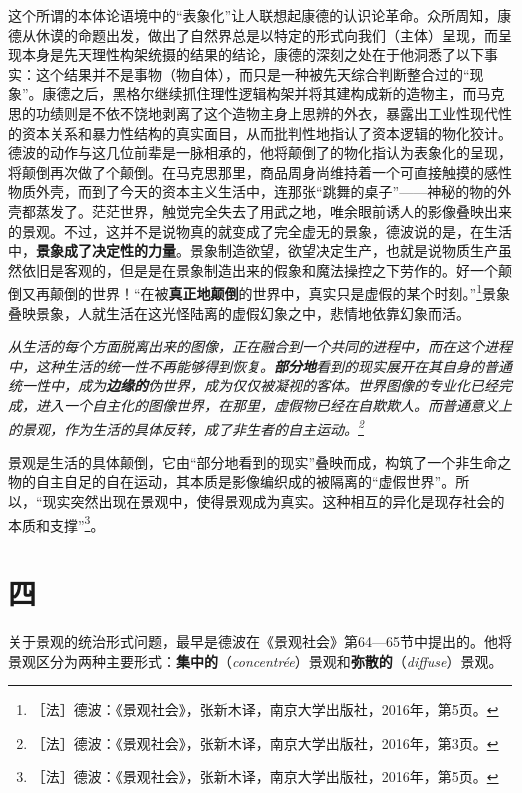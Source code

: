 \documentclass[fontset=fandol, a4paper, 12pt, openright]{ctexbook}
\renewenvironment{quote}
  {\list{}{\rightmargin\leftmargin}%
   \item\relax\small\itshape\color{darkgray}}
  {\endlist}
\begin{document}
这个所谓的本体论语境中的“表象化”让人联想起康德的认识论革命。众所周知，康德从休谟的命题出发，做出了自然界总是以特定的形式向我们（主体）呈现，而呈现本身是先天理性构架统摄的结果的结论，康德的深刻之处在于他洞悉了以下事实：这个结果并不是事物（物自体），而只是一种被先天综合判断整合过的“现象”。康德之后，黑格尔继续抓住理性逻辑构架并将其建构成新的造物主，而马克思的功绩则是不依不饶地剥离了这个造物主身上思辨的外衣，暴露出工业性现代性的资本关系和暴力性结构的真实面目，从而批判性地指认了资本逻辑的物化狡计。德波的动作与这几位前辈是一脉相承的，他将颠倒了的物化指认为表象化的呈现，将颠倒再次做了个颠倒。在马克思那里，商品周身尚维持着一个可直接触摸的感性物质外壳，而到了今天的资本主义生活中，连那张“跳舞的桌子”——神秘的物的外壳都蒸发了。茫茫世界，触觉完全失去了用武之地，唯余眼前诱人的影像叠映出来的景观。不过，这并不是说物真的就变成了完全虚无的景象，德波说的是，在生活中，\textbf{景象成了决定性的力量}。景象制造欲望，欲望决定生产，也就是说物质生产虽然依旧是客观的，但是是在景象制造出来的假象和魔法操控之下劳作的。好一个颠倒又再颠倒的世界！“在被\textbf{真正地颠倒}的世界中，真实只是虚假的某个时刻。”\footnote{［法］德波：《景观社会》，张新木译，南京大学出版社，2016年，第5页。}景象叠映景象，人就生活在这光怪陆离的虚假幻象之中，悲情地依靠幻象而活。

\begin{quote}
从生活的每个方面脱离出来的图像，正在融合到一个共同的进程中，而在这个进程中，这种生活的统一性不再能够得到恢复。\textbf{部分地}看到的现实展开在其自身的普通统一性中，成为\textbf{边缘的}伪世界，成为仅仅被凝视的客体。世界图像的专业化已经完成，进入一个自主化的图像世界，在那里，虚假物已经在自欺欺人。而普通意义上的景观，作为生活的具体反转，成了非生者的自主运动。\footnote{［法］德波：《景观社会》，张新木译，南京大学出版社，2016年，第3页。}
\end{quote}

景观是生活的具体颠倒，它由“部分地看到的现实”叠映而成，构筑了一个非生命之物的自主自足的自在运动，其本质是影像编织成的被隔离的“虚假世界”。所以，“现实突然出现在景观中，使得景观成为真实。这种相互的异化是现存社会的\mbox{本质和支撑”\footnote{［法］德波：《景观社会》，张新木译，南京大学出版社，2016年，第5页。}。}

\section*{四}

关于景观的统治形式问题，最早是德波在《景观社会》第64—65节中提出的。他将景观区分为两种主要形式：\textbf{集中的}（\textit{concentrée}）景观和\textbf{弥散的}（\textit{diffuse}）景观。
\end{document}
